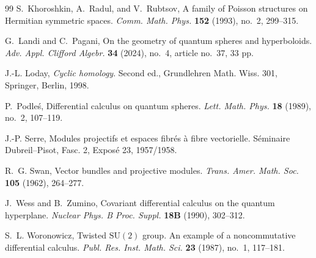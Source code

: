 \documentclass[11pt]{article}
\numberwithin{equation}{section}
\theoremstyle{plain}
\theoremstyle{definition}
\begin{document}
\begin{thebibliography}{99}
S.~Khoroshkin, A.~Radul, and V.~Rubtsov, A family of Poisson structures on Hermitian symmetric spaces.
\emph{Comm. Math. Phys.} \textbf{152} (1993), no.~2, 299--315.

G.~Landi and C.~Pagani, On the geometry of quantum spheres and hyperboloids.
\emph{Adv. Appl. Clifford Algebr.} \textbf{34} (2024), no.~4, article no.~37, 33 pp.

J.-L. Loday, \emph{Cyclic homology}.
Second ed., Grundlehren Math. Wiss. 301, Springer, Berlin, 1998.

P.~Podle\'s, Differential calculus on quantum spheres.
\emph{Lett. Math. Phys.} \textbf{18} (1989), no.~2, 107--119.

J.-P. Serre, Modules projectifs et espaces fibr\'es \`a fibre vectorielle.
S\'eminaire Dubreil--Pisot, Fasc. 2, Expos\'e 23, 1957/1958.

R.~G. Swan, Vector bundles and projective modules.
\emph{Trans. Amer. Math. Soc.} \textbf{105} (1962), 264--277.

J.~Wess and B.~Zumino, Covariant differential calculus on the quantum hyperplane.
\emph{Nuclear Phys. B Proc. Suppl.} \textbf{18B} (1990), 302--312.

S.~L. Woronowicz, Twisted $\mathrm{SU}(2)$ group. An example of a noncommutative differential calculus.
\emph{Publ. Res. Inst. Math. Sci.} \textbf{23} (1987), no.~1, 117--181.

\end{thebibliography}
\end{document}
